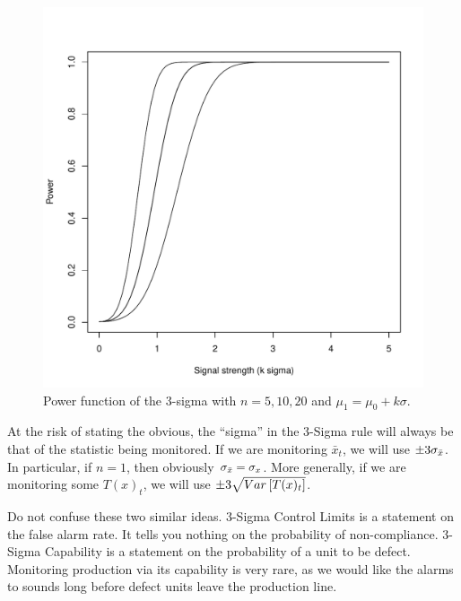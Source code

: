 \begin{figure}[h]
\centering
\includegraphics[height=0.3\textheight]{art/power_function.pdf}
\caption[Power Function]{
\footnotesize
Power function of the 3-sigma \barxChart with $n=5,10,20$ and $\mu_1=\mu_0 + k \sigma$.}
\label{fig:power_function}
\end{figure}

\begin{remark}
At the risk of stating the obvious, the ``sigma'' in the 3-Sigma rule will always be that of the statistic being monitored.
If we are monitoring $\bar{x}_t$, we will use $\pm 3 \sigma_{\bar{x}}$. 
In particular, if $n=1$, then obviously $\sigma_{\bar{x}}=\sigma_x$. 
More generally, if we are monitoring some $T(x)_t$, we will use $\pm 3 \sqrt{\mathop{Var} \left[ T(x)_t \right]}$.
\end{remark}

\begin{remark}
Do not confuse these two similar ideas.
3-Sigma Control Limits is a statement on the false alarm rate. It tells you nothing on the probability of non-compliance. 
3-Sigma Capability is a statement on the probability of a unit to be defect. 
Monitoring production via its capability is very rare, as we would like the alarms to sounds long before defect units leave the production line.
\end{remark}



